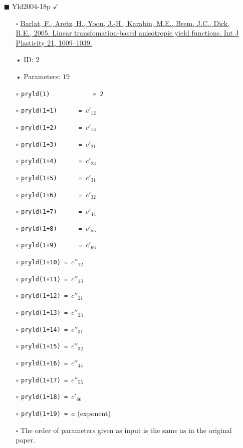 \documentclass[11pt,a4paper,twoside,final,onecolumn,titlepage]{article}
\newcommand{\verified}{\hspace{0.5pt} {\LARGE $\checkmark$}}
\begin{document}
\begin{itemize}
	\item[\tiny$\blacksquare$] Yld2004-18p \verified{}
	\begin{itemize}
		\item[\tiny$\square$] {\small \href{https://doi.org/10.1016/j.ijplas.2004.06.004}{Barlat, F., Aretz, H., Yoon, J.-H., Karabin, M.E., Brem, J.C., Dick, R.E., 2005. Linear transfomation-based anisotropic yield functions. Int J Plasticity 21, 1009–1039.}}\\
		\item[•] ID: $2$
		\item[•] Parameters: $19$\\
		\item[$\circ$] \texttt{pryld(1)\,\,\,\,\,\,\,\,\,\,\,\,= 2}
		\item[$\circ$] \texttt{pryld(1+1)\,\,\,\,\,\,= $c'_{12}$}
		\item[$\circ$] \texttt{pryld(1+2)\,\,\,\,\,\,= $c'_{13}$}
		\item[$\circ$] \texttt{pryld(1+3)\,\,\,\,\,\,= $c'_{21}$}
		\item[$\circ$] \texttt{pryld(1+4)\,\,\,\,\,\,= $c'_{23}$}
		\item[$\circ$] \texttt{pryld(1+5)\,\,\,\,\,\,= $c'_{31}$}
		\item[$\circ$] \texttt{pryld(1+6)\,\,\,\,\,\,= $c'_{32}$}
		\item[$\circ$] \texttt{pryld(1+7)\,\,\,\,\,\,= $c'_{44}$}
		\item[$\circ$] \texttt{pryld(1+8)\,\,\,\,\,\,= $c'_{55}$}
		\item[$\circ$] \texttt{pryld(1+9)\,\,\,\,\,\,= $c'_{66}$}
		\item[$\circ$] \texttt{pryld(1+10) = $c''_{12}$}
		\item[$\circ$] \texttt{pryld(1+11) = $c''_{13}$}
		\item[$\circ$] \texttt{pryld(1+12) = $c''_{21}$}
		\item[$\circ$] \texttt{pryld(1+13) = $c''_{23}$}
		\item[$\circ$] \texttt{pryld(1+14) = $c''_{31}$}
		\item[$\circ$] \texttt{pryld(1+15) = $c''_{32}$}
		\item[$\circ$] \texttt{pryld(1+16) = $c''_{44}$}
		\item[$\circ$] \texttt{pryld(1+17) = $c''_{55}$}
		\item[$\circ$] \texttt{pryld(1+18) = $c'_{66}$}
		\item[$\circ$] \texttt{pryld(1+19) = $a$} (exponent)\\
		\item[\tiny$\square$] {\small The order of parameters given as input is the same as in the original paper.}\\
	\end{itemize}
\end{itemize}
\end{document}
